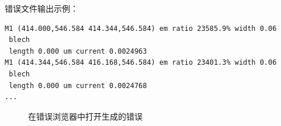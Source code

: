 错误文件输出示例：
\begin{lstlisting}
M1 (414.000,546.584 414.344,546.584) em ratio 23585.9% width 0.06
 blech
 length 0.000 um current 0.0024963
M1 (414.344,546.584 416.168,546.584) em ratio 23401.3% width 0.06
 blech
 length 0.000 um current 0.0024768
...
\end{lstlisting}

\begin{figure}[htbp]
\centering
{}
\caption{在错误浏览器中打开生成的错误}
\label{fig:em-err}
\end{figure}
